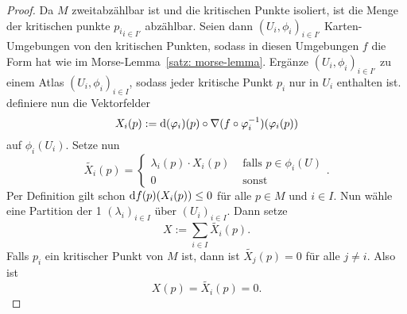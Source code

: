\begin{proof}
    Da $M$ zweitabzählbar ist und die kritischen Punkte isoliert, ist die Menge der kritischen
    punkte ${p_i}_{i \in I'}$ abzählbar. Seien dann ${(U_i, \phi_i)}_{i \in I'}$ Karten-Umgebungen
    von den kritischen Punkten, sodass in diesen Umgebungen $f$ die Form hat wie im 
    Morse-Lemma~\ref{satz: morse-lemma}. Ergänze ${(U_i, \phi_i)}_{i \in I'}$ zu einem Atlas 
    ${(U_i, \phi_i)}_{i \in I}$, sodass jeder kritische Punkt $p_i$ nur in $U_i$ enthalten ist.
    definiere nun die Vektorfelder
    \[ X_i (p) := { \operatorname{d} } (\varphi_i) (p) \circ { \nabla } (f \circ \varphi_i^{-1}) (\varphi_i(p)) \]
    auf $\phi_i(U_i)$. Setze nun
    \[ \tilde{X_i}(p) = \begin{cases}
        \lambda_i (p) \cdot X_i(p) & \text{ falls } p \in \phi_i(U) \\
        0 & \text{ sonst }
    \end{cases} . \]
    Per Definition gilt schon ${ \operatorname{d} } f (p) (X_i(p)) \leq 0$ für alle $p \in M$ und $i \in I$.
    Nun wähle eine Partition der 1 $(\lambda_i)_{i \in I}$ über $(U_i)_{i \in I}$. Dann setze
    \[ X := \sum_{i \in I} \tilde{X_i}(p) . \]
    Falls $p_i$ ein kritischer Punkt von $M$ ist, dann ist $\tilde{X_j}(p) = 0$ 
    für alle $j \neq i$. Also ist 
    \[ X(p) = \tilde{X_i}(p) = 0 . \]
\end{proof}